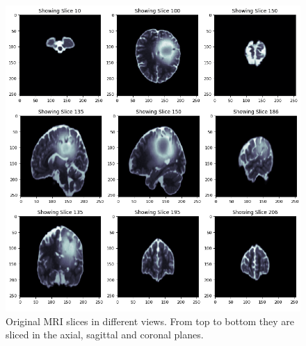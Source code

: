 \begin{figure}[h]
  \centering
  \includegraphics[width=\linewidth]{pictures/originalMRI.png}
  \caption{Original MRI slices in different views.  From top to bottom they are sliced in the axial, sagittal and coronal planes.}
  \label{fig:originalMRI}
\end{figure}

